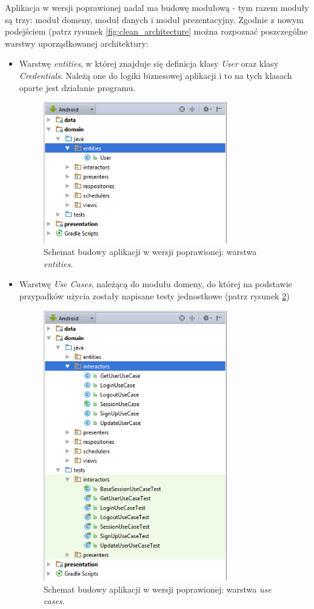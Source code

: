 Aplikacja w wersji poprawionej nadal ma budowę modułową - tym razem moduły są trzy: moduł domeny, moduł danych i moduł prezentacyjny. Zgodnie z nowym podejściem (patrz rysunek \ref{fig:clean_architecture} można rozpoznać poszczególne warstwy uporządkowanej architektury:
\begin{itemize}
\item
Warstwę \textit{entities}, w której znajduje się definicja klasy \textit{User} oraz klasy \textit{Credentials}. Należą one do logiki biznesowej aplikacji i to na tych klasach oparte jest działanie programu. 
\begin{figure}[!htb]
    \centering
    \includegraphics[width=8cm]{imgs/ch6_app_cl_entities.png}
    \caption
{Schemat budowy aplikacji w wersji poprawionej: warstwa \textit{entities}.}
    \label{fig:app_cl_entities}
\end{figure} 

\item
Warstwę \textit{Use Cases}, należącą do modułu domeny, do której na podstawie przypadków użycia zostały napisane testy jednostkowe (patrz rysunek \ref{fig:app_cl_usecases})
\begin{figure}[!htb]
    \centering
    \includegraphics[width=8cm]{imgs/ch6_app_cl_usecases.png}
    \caption
{Schemat budowy aplikacji w wersji poprawionej: warstwa \textit{use cases}.}
    \label{fig:app_cl_usecases}
\end{figure} 


\end{itemize}
